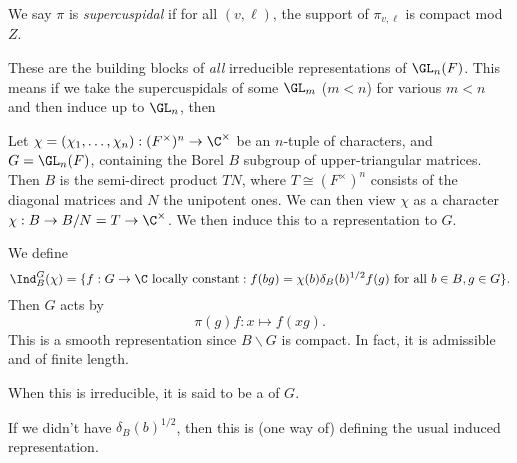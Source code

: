 \documentclass[a4paper]{article}
\begin{document}
\begin{defi}
  We say $\pi$ is \emph{supercuspidal} if for all $(v, \ell)$, the support of $\pi_{v, \ell}$ is compact mod $Z$.
\end{defi}
These are the building blocks of \emph{all} irreducible representations of $\GL_n(F)$. This means if we take the supercuspidals of some $\GL_m$ ($m < n$) for various $m < n$ and then induce up to $\GL_n$, then %

Let $\chi = (\chi_1, \ldots, \chi_n): (F^\times)^n \to \C^\times$ be an $n$-tuple of characters, and $G = \GL_n(F)$, containing the Borel $B$ subgroup of upper-triangular matrices. Then $B$ is the semi-direct product $TN$, where $T \cong (F^\times)^n$ consists of the diagonal matrices and $N$ the unipotent ones. We can then view $\chi$ as a character $\chi: B \to B/N = T \to \C^\times$. We then induce this to a representation to $G$.
\begin{defi}
  We define
  \[
    \Ind^G_B (\chi) = \{f: G \to \C\text{ locally constant} : f(bg) = \chi(b) \delta_B(b)^{1/2} f(g)\text{ for all }b \in B, g \in G\}.
  \]
  Then $G$ acts by
  \[
    \pi(g) f: x \mapsto f(xg).
  \]
  This is a smooth representation since $B\backslash G$ is compact. In fact, it is admissible and of finite length.

  When this is irreducible, it is said to be a  of $G$.
\end{defi}
If we didn't have $\delta_B(b)^{1/2}$, then this is (one way of) defining the usual induced representation.
\end{document}
